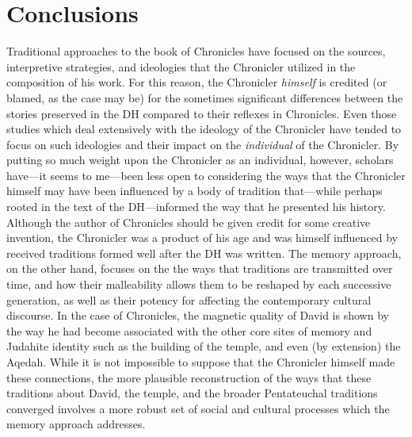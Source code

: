  \hypertarget{conclusions}{%
 \section{Conclusions}\label{conclusions}} 

 Traditional approaches to the book of Chronicles have focused on the sources, interpretive strategies, and ideologies that the Chronicler utilized in the composition of his work. For this reason, the Chronicler \emph{himself} is credited (or blamed, as the case may be) for the sometimes significant differences between the stories preserved in the DH compared to their reflexes in Chronicles. Even those studies which deal extensively with the ideology of the Chronicler have tended to focus on such ideologies and their impact on the \emph{individual} of the Chronicler. By putting so much weight upon the Chronicler as an individual, however, scholars have---it seems to me---been less open to considering the ways that the Chronicler himself may have been influenced by a body of tradition that---while perhaps rooted in the text of the DH---informed the way that he presented his history. Although the author of Chronicles should be given credit for some creative invention, the Chronicler was a product of his age and was himself influenced by received traditions formed well after the DH was written. The memory approach, on the other hand, focuses on the the ways that traditions are transmitted over time, and how their malleability allows them to be reshaped by each successive generation, as well as their potency for affecting the contemporary cultural discourse. In the case of Chronicles, the magnetic quality of David is shown by the way he had become associated with the other core sites of memory and Judahite identity such as the building of the temple, and even (by extension) the Aqedah. While it is not impossible to suppose that the Chronicler himself made these connections, the more plausible reconstruction of the ways that these traditions about David, the temple, and the broader Pentateuchal traditions converged involves a more robust set of social and cultural processes which the memory approach addresses. 